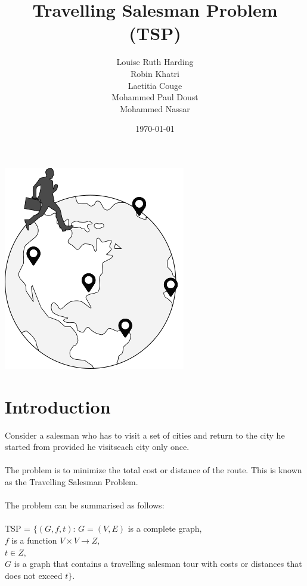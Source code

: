 \documentclass[14pt, english]{article}
\title{{\bf Travelling Salesman Problem (TSP)}}
\author{Louise Ruth Harding \\ Robin Khatri \\ Laetitia Couge\\ Mohammed Paul Doust \\ Mohammed Nassar}
\date{\today}
\begin{document}
\newcommand\tab[1][1.2cm]{\hspace*{#1}}

\begin{titlingpage}
\maketitle
\center \includegraphics[scale=0.5]{tsp.png}

\end{titlingpage}
\tableofcontents
\newpage

\section{Introduction}

Consider a salesman who has to visit a set of cities and return to the city he started from provided he visitseach city only once.\\
\\
\noindent
The problem is to minimize the total cost or distance of the route. This is known as the Travelling Salesman Problem.\\
\\
\noindent
The problem can be summarised as follows: \\
\\
\tab TSP = $\{(G,f,t)$: $G = (V,E)$ is a complete graph,\\
\tab \tab $f$ is a function $V\times V \rightarrow Z,$\\
\tab \tab $t \in Z,$ \\
\tab \tab $G$ is a graph that contains a travelling salesman tour with costs or distances that\\ \tab \tab does not exceed $t\}$.
\end{document}
